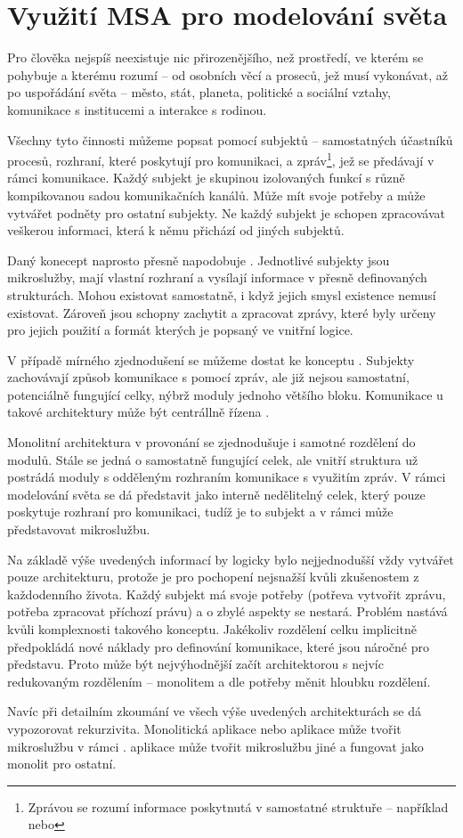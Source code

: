 \section{Využití MSA pro modelování světa}\label{sec:msa-model-of-world}

Pro člověka nejspíš neexistuje nic přirozenějšího, než prostředí, ve kterém se pohybuje a kterému rozumí – od osobních věcí a proseců, jež musí vykonávat, až po uspořádání světa – město, stát, planeta, politické a sociální vztahy, komunikace s institucemi a interakce s rodinou.

Všechny tyto činnosti můžeme popsat pomocí subjektů – samostatných účastníků procesů, rozhraní, které poskytují pro komunikaci, a zpráv\footnote{Zprávou se rozumí informace poskytnutá v samostatné struktuře – například  nebo }, jež se předávají v rámci komunikace.
Každý subjekt je skupinou izolovaných funkcí s různě kompikovanou sadou komunikačních kanálů.
Může mít svoje potřeby a může vytvářet podněty pro ostatní subjekty.
Ne každý subjekt je schopen zpracovávat veškerou informaci, která k němu přichází od jiných subjektů.

Daný konecept naprosto přesně napodobuje .
Jednotlivé subjekty jsou mikroslužby, mají vlastní rozhraní a vysílají informace v přesně definovaných strukturách.
Mohou existovat samostatně, i když jejich smysl existence nemusí existovat.
Zároveň jsou schopny zachytit a zpracovat zprávy, které byly určeny pro jejich použití a formát kterých je popsaný ve vnitřní logice.

V případě mírného zjednodušení se můžeme dostat ke konceptu .
Subjekty zachovávají způsob komunikace s pomocí zpráv, ale již nejsou samostatní, potenciálně fungující celky, nýbrž moduly jednoho většího bloku.
Komunikace u takové architektury může být centrállně řízena .\cite{soavsmsa}

Monolitní architektura v provonání se  zjednodušuje i samotné rozdělení do modulů.
Stále se jedná o samostatně fungující celek, ale vnitří struktura už postrádá moduly s odděleným rozhraním komunikace s využitím zpráv.
V rámci modelování světa se dá představit jako interně nedělitelný celek, který pouze poskytuje rozhraní pro komunikaci, tudíž je to subjekt a v rámci  může představovat mikroslužbu.

Na základě výše uvedených informací by logicky bylo nejjednodušší vždy vytvářet pouze  architekturu, protože je pro pochopení nejsnažší kvůli zkušenostem z každodenního života.
Každý subjekt má svoje potřeby (potřeva vytvořit zprávu, potřeba zpracovat příchozí právu) a o zbylé aspekty se nestará.
Problém nastává kvůli komplexnosti takového konceptu.
Jakékoliv rozdělení celku implicitně předpokládá nové náklady pro definování komunikace, které jsou náročné pro představu.
Proto může být nejvýhodnější začít architektorou s nejvíc redukovaným rozdělením – monolitem a dle potřeby měnit hloubku rozdělení.

Navíc při detailním zkoumání ve všech výše uvedených architekturách se dá vypozorovat rekurzivita.
Monolitická aplikace nebo  aplikace může tvořit mikroslužbu v rámci .
 aplikace může tvořit mikroslužbu jiné  a fungovat jako monolit pro ostatní.
